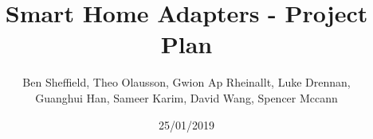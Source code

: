 \documentclass[onecolumn]{IEEEtran}
\begin{document}
\title{Smart Home Adapters - Project Plan}
\author{Ben Sheffield, Theo Olausson, Gwion Ap Rheinallt, Luke Drennan, \\Guanghui Han, Sameer Karim, David Wang, Spencer Mccann}
\date{25/01/2019} %

\maketitle
\end{document}
